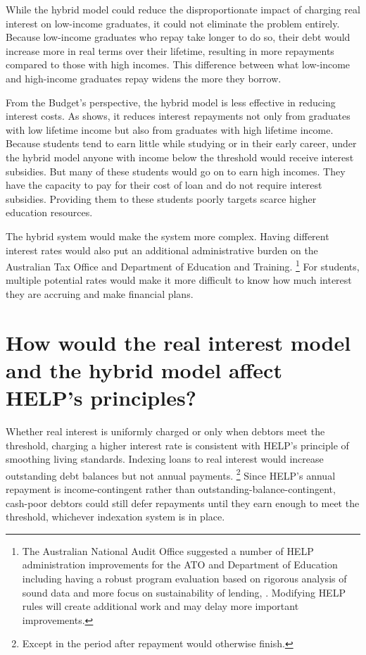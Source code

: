 \documentclass[embargoed]{grattan}
\begin{document}
While the hybrid model could reduce the disproportionate impact of charging real interest on low-income graduates, it could not eliminate the problem entirely.
Because low-income graduates who repay take longer to do so, their debt would increase more in real terms over their lifetime, resulting in more repayments compared to those with high incomes.
This difference between what low-income and high-income graduates repay widens the more they borrow.

From the Budget's perspective, the hybrid model is less effective in reducing interest costs.
As  shows, it reduces interest repayments not only from graduates with low lifetime income but also from graduates with high lifetime income.
Because students tend to earn little while studying or in their early career, under the hybrid model anyone with income below the threshold would receive interest subsidies.
But many of these students would go on to earn high incomes.
They have the capacity to pay for their cost of loan and do not require interest subsidies.
Providing them to these students poorly targets scarce higher education resources.

The hybrid system would make the system more complex.
Having different interest rates would also put an additional administrative burden on the Australian Tax Office and Department of Education and Training.%
\footnote{The Australian National Audit Office suggested a number of \gls{HELP} administration improvements for the \gls{ATO} and Department of Education including having a robust program evaluation based on rigorous analysis of sound data and more focus on sustainability of lending, \textcite[][p.~7, no.~7]{ANAO2016AdministrationHigherEducation}.
Modifying \gls{HELP} rules will create additional work and may delay more important improvements.} 
For students, multiple potential rates would make it more difficult to know how much interest they are accruing and make financial plans.

\section[How would the real interest model and the hybrid model affect {HELP}'s principles?]{How would the real interest model and the hybrid model affect \gls{HELP}'s principles?}\label{how-would-the-real-interest-model-and-the-hybrid-model-affect-helps-principles}

Whether real interest is uniformly charged or only when debtors meet the threshold, charging a higher interest rate is consistent with \gls{HELP}'s principle of smoothing living standards.
Indexing loans to real interest would increase outstanding debt balances but not annual payments.%
\footnote{Except in the period after repayment would otherwise finish.} 
Since \gls{HELP}'s annual repayment is income-contingent rather than outstanding-balance-contingent, cash-poor debtors could still defer repayments until they earn enough to meet the threshold, whichever indexation system is in place.
\end{document}
